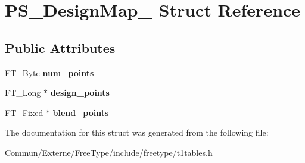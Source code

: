 \hypertarget{struct_p_s___design_map__}{}\section{P\+S\+\_\+\+Design\+Map\+\_\+ Struct Reference}
\label{struct_p_s___design_map__}
\subsection*{Public Attributes}
\begin{DoxyCompactItemize}
\item 
F\+T\+\_\+\+Byte {\bfseries num\+\_\+points}\hypertarget{struct_p_s___design_map___a505a70dd0f497f177fffca9bc4e5d0a5}{}\label{struct_p_s___design_map___a505a70dd0f497f177fffca9bc4e5d0a5}

\item 
F\+T\+\_\+\+Long $\ast$ {\bfseries design\+\_\+points}\hypertarget{struct_p_s___design_map___abd7a86ba33248ceed657c31063b49679}{}\label{struct_p_s___design_map___abd7a86ba33248ceed657c31063b49679}

\item 
F\+T\+\_\+\+Fixed $\ast$ {\bfseries blend\+\_\+points}\hypertarget{struct_p_s___design_map___a74a555fb4315fca7477f6d20d49686ec}{}\label{struct_p_s___design_map___a74a555fb4315fca7477f6d20d49686ec}

\end{DoxyCompactItemize}


The documentation for this struct was generated from the following file\+:\begin{DoxyCompactItemize}
\item 
Commun/\+Externe/\+Free\+Type/include/freetype/t1tables.\+h\end{DoxyCompactItemize}
